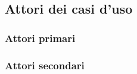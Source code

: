 \subsection{Attori dei casi d'uso}
	\subsubsection{Attori primari}
	\subsubsection{Attori secondari}
	